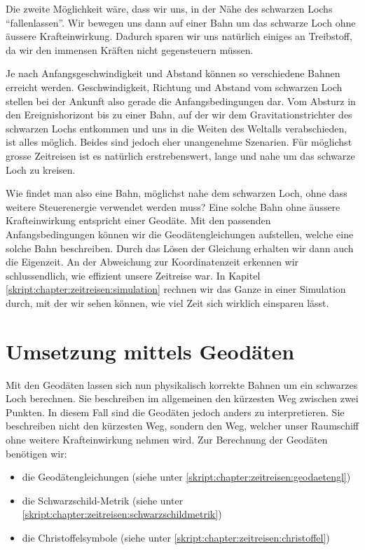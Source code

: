 \begin{refsection}
	Die zweite Möglichkeit wäre, dass wir uns, in der Nähe des schwarzen Lochs ``fallenlassen''. Wir bewegen uns dann auf einer Bahn um das schwarze Loch  ohne äussere Krafteinwirkung. Dadurch sparen wir uns natürlich einiges an Treibstoff, da wir den immensen Kräften nicht gegensteuern müssen. 
    
    Je nach Anfangsgeschwindigkeit und Abstand können so verschiedene Bahnen erreicht werden. Geschwindigkeit, Richtung und Abstand vom schwarzen Loch stellen bei der Ankunft also gerade die Anfangsbedingungen dar. Vom Absturz in den Ereignishorizont bis zu einer Bahn, auf der wir dem Gravitationstrichter des schwarzen Lochs entkommen und uns in die Weiten des Weltalls verabschieden, ist alles möglich. Beides sind jedoch eher unangenehme Szenarien. Für möglichst grosse Zeitreisen ist es natürlich erstrebenswert, lange und nahe um das schwarze Loch zu kreisen.
	
	Wie findet man also eine Bahn, möglichst nahe dem schwarzen Loch, ohne dass weitere Steuerenergie verwendet werden muss?
    Eine solche Bahn ohne äussere Krafteinwirkung entspricht einer Geodäte. Mit den passenden Anfangsbedingungen können wir die Geodätengleichungen aufstellen, welche eine solche Bahn beschreiben. Durch das Lösen der Gleichung erhalten wir dann auch die Eigenzeit. An der Abweichung zur Koordinatenzeit erkennen wir schlussendlich, wie effizient unsere Zeitreise war.
    In Kapitel \ref{skript:chapter:zeitreisen:simulation} rechnen wir das Ganze in einer Simulation durch, mit der wir sehen können, wie viel Zeit sich wirklich einsparen lässt.
	
	\section{Umsetzung mittels Geodäten}
	Mit den Geodäten lassen sich nun physikalisch korrekte Bahnen um ein schwarzes Loch berechnen. Sie beschreiben im allgemeinen den kürzesten Weg zwischen zwei Punkten. In diesem Fall sind die Geodäten jedoch anders zu interpretieren. Sie beschreiben nicht den kürzesten Weg, sondern den Weg, welcher unser Raumschiff ohne weitere Krafteinwirkung nehmen wird.
	Zur Berechnung der Geodäten benötigen wir:
	\begin{itemize}
		\item die Geodätengleichungen (siehe unter \ref{skript:chapter:zeitreisen:geodaetengl})
		\item die Schwarzschild-Metrik (siehe unter \ref{skript:chapter:zeitreisen:schwarzschildmetrik})
		\item die Christoffelsymbole (siehe unter \ref{skript:chapter:zeitreisen:christoffel})
	\end{itemize}


\end{refsection}
